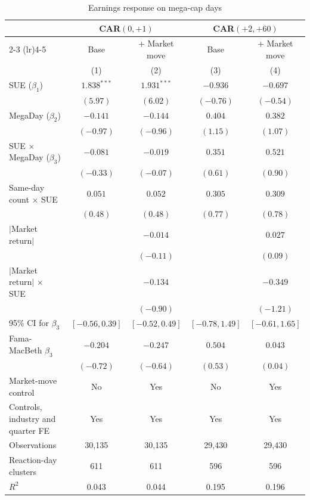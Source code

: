 \begin{table}[htbp]
\centering
\small
\caption{Earnings response on mega-cap days}
\label{tab:main}
\begin{tabular}{lcccc}
\toprule
 & \multicolumn{2}{c}{CAR$(0,+1)$} & \multicolumn{2}{c}{CAR$(+2,+60)$} \\
\cmidrule(lr){2-3} \cmidrule(lr){4-5}
 & Base & + Market move & Base & + Market move \\
 & (1) & (2) & (3) & (4) \\
\midrule
SUE ($\beta_1$) & $1.838^{***}$ & $1.931^{***}$ & $-0.936$ & $-0.697$ \\
 & $(5.97)$ & $(6.02)$ & $(-0.76)$ & $(-0.54)$ \\[2pt]
MegaDay ($\beta_2$) & $-0.141$ & $-0.144$ & $0.404$ & $0.382$ \\
 & $(-0.97)$ & $(-0.96)$ & $(1.15)$ & $(1.07)$ \\[2pt]
SUE $\times$ MegaDay ($\beta_3$) & $-0.081$ & $-0.019$ & $0.351$ & $0.521$ \\
 & $(-0.33)$ & $(-0.07)$ & $(0.61)$ & $(0.90)$ \\[2pt]
Same-day count $\times$ SUE & $0.051$ & $0.052$ & $0.305$ & $0.309$ \\
 & $(0.48)$ & $(0.48)$ & $(0.77)$ & $(0.78)$ \\[2pt]
$|$Market return$|$ &  & $-0.014$ &  & $0.027$ \\
 &  & $(-0.11)$ &  & $(0.09)$ \\[2pt]
$|$Market return$|$ $\times$ SUE &  & $-0.134$ &  & $-0.349$ \\
 &  & $(-0.90)$ &  & $(-1.21)$ \\[2pt]
\midrule
95\% CI for $\beta_3$ & $[-0.56, 0.39]$ & $[-0.52, 0.49]$ & $[-0.78, 1.49]$ & $[-0.61, 1.65]$ \\
Fama-MacBeth $\beta_3$ & $-0.204$ & $-0.247$ & $0.504$ & $0.043$ \\
 & $(-0.72)$ & $(-0.64)$ & $(0.53)$ & $(0.04)$ \\
\midrule
Market-move control & No & Yes & No & Yes \\
Controls, industry and quarter FE & Yes & Yes & Yes & Yes \\
Observations & 30,135 & 30,135 & 29,430 & 29,430 \\
Reaction-day clusters & 611 & 611 & 596 & 596 \\
$R^2$ & 0.043 & 0.044 & 0.195 & 0.196 \\
\bottomrule
\end{tabular}

\end{table}
